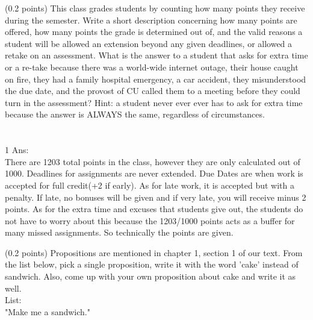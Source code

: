 \documentclass[9pt]{article}
\def\solutions{1} %
\begin{document}
\fi
\vspace{10mm}
\newpage
\vspace{5mm}
\item (0.2 points) This class grades students by counting how many points they
receive during the semester. Write a short description concerning how many points
are offered, how many points the grade is determined out of, and the valid reasons
a student will be allowed an extension beyond any given deadlines, or allowed a
retake on an assessment. What is the answer to a student that asks for extra time
or a re-take because there was a world-wide internet outage, their house caught on
fire, they had a family hospital emergency, a car accident, they misunderstood the
due date, and the provost of CU called them to a meeting before they could turn in
the assessment? Hint: a student never ever ever has to ask for extra time because
the answer is ALWAYS the same, regardless of circumstances. \\
\\
\\
\if \solutions1
Ans: \\There  are 1203 total points in the class, however they are only calculated out of 1000. Deadlines for assignments are never extended. Due Dates are when work is accepted for full credit(+2 if early). As for late work, it is accepted but with a penalty. If late, no bonuses will be given and if very late, you will receive minus 2 points. As for the extra time and excuses that students give out, the students do not have to worry about this because the 1203/1000 points acts as a buffer for many missed assignments. So technically the points are given.   
\fi
\vspace{10mm}
\newpage
\vspace{5mm}
\item (0.2 points) Propositions are mentioned in chapter 1, section 1 of our text.
From the list below, pick a single proposition, write it with the word 'cake'
instead of sandwich. Also, come up with your own proposition about cake and write
it as well.\\
List:\\
"Make me a sandwich."\\
\end{document}
